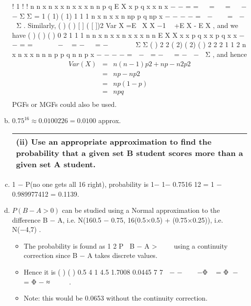 \documentclass[a4paper,12pt]{article}
\begin{document}
\begin{enumerate}[(a)]
\begin{table}[ht!]
\begin{tabular}{|p{15cm}|}
\\ \hline
  \end{tabular}
\end{table}
!
1 ! !
n n x n x
x n x
x x
n n p q E X x p q
x x n x
−
−
= =
 
=   =   − −
Σ Σ
= 1 ( 1) ( 1)
1
1
1
n
x n x
x
n
np p q np
x
− − − −
=
 − 
  =  − 
Σ .
Similarly, ( ) ( ) [ ] ( [ ])2 Var X =E X X −1  +E X - E X , and we have
( ) ( ) ( )
0 2
1 1 1
n n
x n x x n x
x x
n n
E X X x x p q x x p q
x x
− −
= =
   
 −  = −   = −  
   
Σ Σ
( ) 2 2 ( 2) ( 2) ( ) 2
2
2
1 1
2
n
x n x
x
n
n n p p q n n p
x
− − − −
=
 − 
= −   = −  − 
Σ ,
and hence 
\begin{eqnarray*}
Var (X) &=& n(n −1) p2 + np − n2 p2 \\
&=& np − np2\\ 
&=& np(1-p) \\
&=& npq \\
\end{eqnarray*}
PGFs or MGFs could also be used.
\item  $0.75^{16} \approx 0.0100226 = 0.0100$ approx.
\newpage
\begin{table}[ht!]
 \centering
 \begin{tabular}{|p{15cm}|}
 \hline
\noindent (ii) Use an appropriate approximation to find the probability that a given set B
student scores more than a given set A student.



\\ \hline
  \end{tabular}
\end{table}


\item 1 − P(no one gets all 16 right), probability is { }1− 1− 0.7516 12
= 1 − {0.9899774}12 = 0.1139.
\item $P(B − A > 0)$ can be studied using a Normal approximation to the difference
B − A, i.e. N(16{0.5 − 0.75}, 16{(0.5×0.5) + (0.75×0.25)}), i.e. N(−4,7) .
\begin{itemize}
\item The probability is found as 1
2
P B − A > 
 
using a continuity correction since B − A
takes discrete values.
\item Hence it is ( ) ( ) 0.5 4 1 4.5 1.7008 0.0445
7 7
 − −    −Φ  = Φ −  = Φ − ≈
   
.
\item Note: this would be 0.0653 without the continuity correction.
\end{itemize}
\newpage


\end{enumerate}
\end{document}
